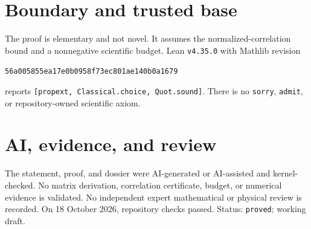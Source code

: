 \documentclass[11pt]{article}
\begin{document}
\section{Boundary and trusted base}
The proof is elementary and not novel. It assumes the normalized-correlation bound and a
nonnegative scientific budget. Lean \texttt{v4.35.0} with Mathlib revision
\begin{center}\texttt{56a005855ea17e0b0958f73ec801ae140b0a1679}\end{center}
reports \texttt{[propext, Classical.choice, Quot.sound]}. There is no \texttt{sorry},
\texttt{admit}, or repository-owned scientific axiom.

\section{AI, evidence, and review}
The statement, proof, and dossier were AI-generated or AI-assisted and kernel-checked.
No matrix derivation, correlation certificate, budget, or numerical evidence is
validated. No independent expert mathematical or physical review is recorded. On 18
October 2026, repository checks passed. Status: \texttt{proved}; working draft.
\end{document}
